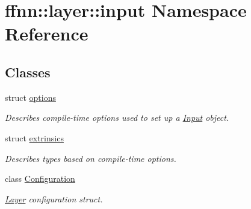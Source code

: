 \hypertarget{namespaceffnn_1_1layer_1_1input}{\section{ffnn\-:\-:layer\-:\-:input Namespace Reference}
\label{namespaceffnn_1_1layer_1_1input}
}
\subsection*{Classes}
\begin{DoxyCompactItemize}
\item 
struct \hyperlink{structffnn_1_1layer_1_1input_1_1options}{options}
\begin{DoxyCompactList}\small\item\em Describes compile-\/time options used to set up a \hyperlink{classffnn_1_1layer_1_1_input}{Input} object. \end{DoxyCompactList}\item 
struct \hyperlink{structffnn_1_1layer_1_1input_1_1extrinsics}{extrinsics}
\begin{DoxyCompactList}\small\item\em Describes types based on compile-\/time options. \end{DoxyCompactList}\item 
class \hyperlink{classffnn_1_1layer_1_1input_1_1_configuration}{Configuration}
\begin{DoxyCompactList}\small\item\em \hyperlink{classffnn_1_1layer_1_1_layer}{Layer} configuration struct. \end{DoxyCompactList}\end{DoxyCompactItemize}
